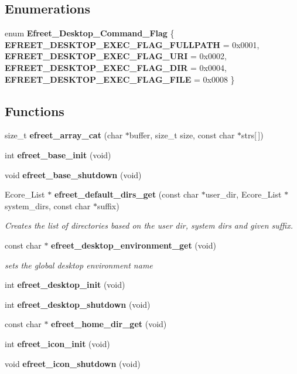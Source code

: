 \subsection*{Enumerations}
\begin{CompactItemize}
\item 
enum {\bf Efreet\_\-Desktop\_\-Command\_\-Flag} \{ {\bf EFREET\_\-DESKTOP\_\-EXEC\_\-FLAG\_\-FULLPATH} =  0x0001, 
{\bf EFREET\_\-DESKTOP\_\-EXEC\_\-FLAG\_\-URI} =  0x0002, 
{\bf EFREET\_\-DESKTOP\_\-EXEC\_\-FLAG\_\-DIR} =  0x0004, 
{\bf EFREET\_\-DESKTOP\_\-EXEC\_\-FLAG\_\-FILE} =  0x0008
 \}
\end{CompactItemize}
\subsection*{Functions}
\begin{CompactItemize}
\item 
size\_\-t {\bf efreet\_\-array\_\-cat} (char $\ast$buffer, size\_\-t size, const char $\ast$strs[$\,$])
\item 
int {\bf efreet\_\-base\_\-init} (void)
\item 
void {\bf efreet\_\-base\_\-shutdown} (void)
\item 
Ecore\_\-List $\ast$ {\bf efreet\_\-default\_\-dirs\_\-get} (const char $\ast$user\_\-dir, Ecore\_\-List $\ast$system\_\-dirs, const char $\ast$suffix)
\begin{CompactList}\small\item\em Creates the list of directories based on the user dir, system dirs and given suffix. \item\end{CompactList}\item 
const char $\ast$ {\bf efreet\_\-desktop\_\-environment\_\-get} (void)
\begin{CompactList}\small\item\em sets the global desktop environment name \item\end{CompactList}\item 
int {\bf efreet\_\-desktop\_\-init} (void)
\item 
int {\bf efreet\_\-desktop\_\-shutdown} (void)
\item 
const char $\ast$ {\bf efreet\_\-home\_\-dir\_\-get} (void)
\item 
int {\bf efreet\_\-icon\_\-init} (void)
\item 
void {\bf efreet\_\-icon\_\-shutdown} (void)
\item 

\end{CompactItemize}
